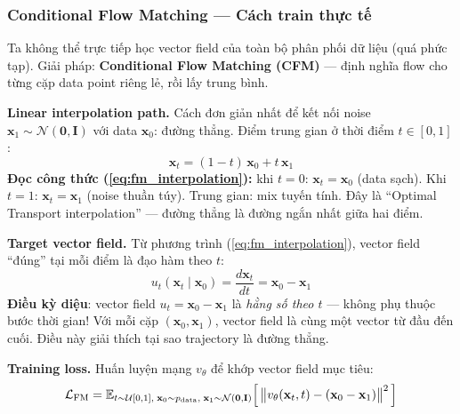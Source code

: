 \subsubsection{Conditional Flow Matching --- Cách train thực tế}

Ta không thể trực tiếp học vector field của toàn bộ phân phối dữ liệu (quá phức tạp). Giải pháp: \textbf{Conditional Flow Matching (CFM)} --- định nghĩa flow cho từng cặp data point riêng lẻ, rồi lấy trung bình.

\textbf{Linear interpolation path.}
Cách đơn giản nhất để kết nối noise $\mathbf{x}_1 \sim \mathcal{N}(\mathbf{0}, \mathbf{I})$ với data $\mathbf{x}_0$: đường thẳng. Điểm trung gian ở thời điểm $t \in [0,1]$:
\begin{equation}
    \mathbf{x}_t = (1 - t)\,\mathbf{x}_0 + t\,\mathbf{x}_1
    \label{eq:fm_interpolation}
\end{equation}
\textbf{Đọc công thức (\ref{eq:fm_interpolation}):} khi $t=0$: $\mathbf{x}_t = \mathbf{x}_0$ (data sạch). Khi $t=1$: $\mathbf{x}_t = \mathbf{x}_1$ (noise thuần túy). Trung gian: mix tuyến tính. Đây là ``Optimal Transport interpolation'' --- đường thẳng là đường ngắn nhất giữa hai điểm.

\textbf{Target vector field.}
Từ phương trình (\ref{eq:fm_interpolation}), vector field ``đúng'' tại mỗi điểm là đạo hàm theo $t$:
\begin{equation}
    u_t(\mathbf{x}_t \mid \mathbf{x}_0) = \frac{d\mathbf{x}_t}{dt} = \mathbf{x}_0 - \mathbf{x}_1
    \label{eq:fm_target}
\end{equation}
\textbf{Điều kỳ diệu}: vector field $u_t = \mathbf{x}_0 - \mathbf{x}_1$ là \textit{hằng số theo $t$} --- không phụ thuộc bước thời gian! Với mỗi cặp $(\mathbf{x}_0, \mathbf{x}_1)$, vector field là cùng một vector từ đầu đến cuối. Điều này giải thích tại sao trajectory là đường thẳng.

\textbf{Training loss.}
Huấn luyện mạng $v_\theta$ để khớp vector field mục tiêu:
\begin{equation}
    \mathcal{L}_{\text{FM}} = \mathbb{E}_{t \sim \mathcal{U}[0,1],\; \mathbf{x}_0 \sim p_\text{data},\; \mathbf{x}_1 \sim \mathcal{N}(\mathbf{0},\mathbf{I})}
    \Bigl[\,\bigl\|v_\theta(\mathbf{x}_t, t) - (\mathbf{x}_0 - \mathbf{x}_1)\bigr\|^2\,\Bigr]
\end{equation}

